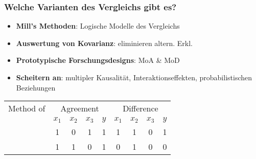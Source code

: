 \documentclass{beamer}
\begin{document}
\begin{frame}
  \frametitle{Welche Varianten des Vergleichs gibt es?}
  \begin{itemize}
    \item \textbf{Mill's Methoden}: Logische Modelle des Vergleichs
    \item \textbf{Auswertung von Kovarianz}: eliminieren altern. Erkl.
    \item \textbf{Prototypische Forschungsdesigns}: MoA \& MoD
    \item \textbf{Scheitern an}: multipler Kausalität, Interaktionseffekten, probabilistischen Beziehungen
  \end{itemize}
  \begin{table}[b]
    \centering
    \begin{tabular}{l *{8}{c}}
      \toprule
      Method of & \multicolumn{4}{c}{Agreement} & \multicolumn{4}{c}{Difference}\\
      \cmidrule(lr){2-5} \cmidrule(lr){6-9}
      & $x_1$ & $x_2$ & $x_3$ & $y$ & $x_1$ & $x_2$ & $x_3$ & $y$ \\
      \midrule
      & 1 & 0 & 1 & 1 & 1 & 1 & 0 & 1\\
      & 1 & 1 & 0 & 1 & 0 & 1 & 0 & 0\\
      \bottomrule
    \end{tabular}
  \end{table}
\end{frame}
\end{document}
